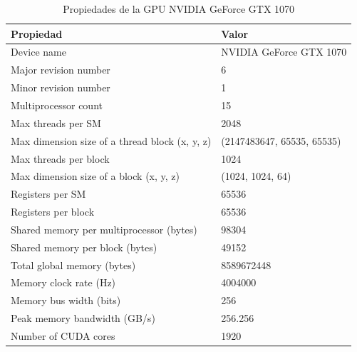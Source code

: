\documentclass{article}
\begin{document}
		\begin{table}[H]
			\begin{adjustbox}{width=\textwidth, keepaspectratio}
				\begin{tabular}{|l|l|}
					\hline
					\textbf{Propiedad} & \textbf{Valor} \\ \hline
					Device name & NVIDIA GeForce GTX 1070 \\ \hline
					Major revision number & 6 \\ \hline
					Minor revision number & 1 \\ \hline
					Multiprocessor count & 15 \\ \hline
					Max threads per SM & 2048 \\ \hline
					Max dimension size of a thread block (x, y, z) & (2147483647, 65535, 65535) \\ \hline
					Max threads per block & 1024 \\ \hline
					Max dimension size of a block (x, y, z) & (1024, 1024, 64) \\ \hline
						Registers per SM & 65536 \\ \hline
					Registers per block & 65536 \\ \hline
					Shared memory per multiprocessor (bytes) & 98304 \\ \hline
					Shared memory per block (bytes) & 49152 \\ \hline
					Total global memory (bytes) & 8589672448 \\ \hline
					Memory clock rate (Hz) & 4004000 \\ \hline
					Memory bus width (bits) & 256 \\ \hline
					Peak memory bandwidth (GB/s) & 256.256 \\ \hline
					Number of CUDA cores & 1920 \\ \hline
				\end{tabular}
			\end{adjustbox}
			\centering
			\caption{Propiedades de la GPU NVIDIA GeForce GTX 1070}
		\end{table}
\end{document}
